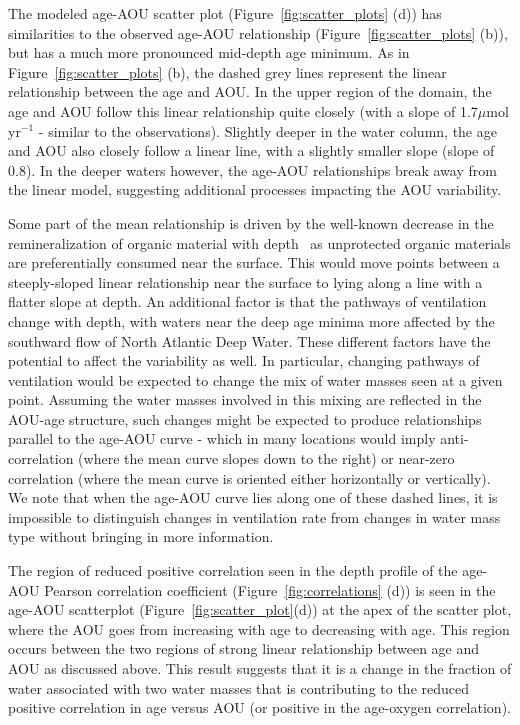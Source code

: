 The modeled age-AOU scatter plot (Figure~\ref{fig:scatter_plots} (d)) has
similarities to the observed age-AOU relationship (Figure~\ref{fig:scatter_plots}
(b)), but has a much more pronounced mid-depth age minimum. As in
Figure~\ref{fig:scatter_plots} (b), the dashed grey lines represent the linear
relationship between the age and AOU. In the upper region of the domain, the age
and AOU follow this linear relationship quite closely (with a slope of 1.7$\mu$mol yr$^{-1}$
- similar to the observations). Slightly deeper in the water column, the age and
AOU also closely follow a linear line, with a slightly smaller slope (slope of 0.8).
In the deeper waters however, the age-AOU relationships break away from the linear
model, suggesting additional processes impacting the AOU variability.

Some part of the mean relationship is driven by the well-known decrease in the
remineralization of organic material with depth~\citep{Armstrong2002,Klaas2002}
as unprotected organic materials are preferentially consumed near the surface.
This would move points between a steeply-sloped linear relationship near the
surface to lying along a line with a flatter slope at depth. An additional
factor is that the pathways of ventilation change with depth, with waters near
the deep age minima more affected by the southward flow of North Atlantic Deep
Water. These different factors have the potential to affect the variability as
well. In particular, changing pathways of ventilation would be expected to
change the mix of water masses seen at a given point. Assuming the water masses
involved in this mixing are reflected in the AOU-age structure, such changes
might be expected to produce relationships parallel to the age-AOU curve - which
in many locations would imply anti-correlation (where the mean curve slopes down
to the right) or near-zero correlation (where the mean curve is oriented either
horizontally or vertically). We note that when the age-AOU curve lies along one
of these dashed lines, it is impossible to distinguish changes in ventilation
rate from changes in water mass type without bringing in more information.

The region of reduced positive correlation seen in the depth profile of the age-AOU
Pearson correlation coefficient (Figure~\ref{fig:correlations} (d)) is seen in the
age-AOU scatterplot (Figure~\ref{fig:scatter_plot}(d)) at the apex of the scatter
plot, where the AOU goes from increasing with age to decreasing with age. This
region occurs between the two regions of strong linear relationship between age
and AOU as discussed above. This result suggests that it is a change in the
fraction of water associated with two water masses that is contributing to the
reduced positive correlation in age versus AOU (or positive in the age-oxygen
correlation).

